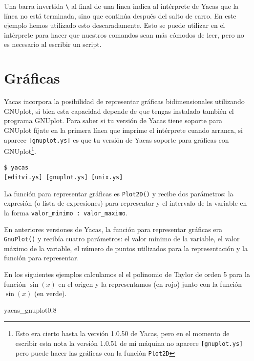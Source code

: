 Una  barra  invertida  \verb+\+  al  final  de  una  línea  indica  al
intérprete de Yacas que la línea  no está terminada, sino que continúa
después  del salto  de carro.  En  este ejemplo  hemos utilizado  esto
descaradamente. Esto se puede utilizar en el intérprete para hacer que
nuestros comandos  sean más cómodos de  leer, pero no es  necesario al
escribir un script.



\section{Gráficas}


Yacas incorpora la posibilidad de representar gráficas bidimensionales
utilizando  GNUplot, si  bien  esta capacidad  depende  de que  tengas
instalado también  el programa  GNUplot. Para saber  si tu  versión de
Yacas  tiene soporte  para  GNUplot  fíjate en  la  primera línea  que
imprime el  intérprete cuando arranca, si  aparece \verb+[gnuplot.ys]+
es   que   tu   versión   de   Yacas   soporte   para   gráficas   con
GNUplot\footnote{Esto  era cierto  hasta la  versión 1.0.50  de Yacas,
pero  en el  momento de  escribir esta  nota la  versión 1.0.51  de mi
máquina no  aparece {\tt [gnuplot.ys]}  pero puede hacer  las gráficas
con la función {\tt Plot2D}}.

\begin{verbatim}
$ yacas
[editvi.ys] [gnuplot.ys] [unix.ys]
\end{verbatim}

La función para  representar gráficas es \verb+Plot2D()+  y recibe dos
parámetros: la expresión  (o lista de expresiones)  para representar y
el  intervalo  de  la  variable  en  la  forma  {\tt  valor\_minimo  :
valor\_maximo}.

En anteriores versiones de Yacas, la función para representar gráficas
era \verb+GnuPlot()+ y  recibía cuatro parámetros: el  valor mínimo de
la  variable, el  valor máximo  de la  variable, el  número de  puntos
utilizados para la representación y la función para representar. 

En los  siguientes ejemplos  calculamos el el  polinomio de  Taylor de
orden 5 para la función $\sin(x)$  en el origen y la representamos (en
rojo) junto con la función $\sin(x)$ (en verde).

\begin{figura}{yacas_gnuplot}{0.8}
\caption{Representación gráfica con GNUplot desde Yacas}
\end{figura}


